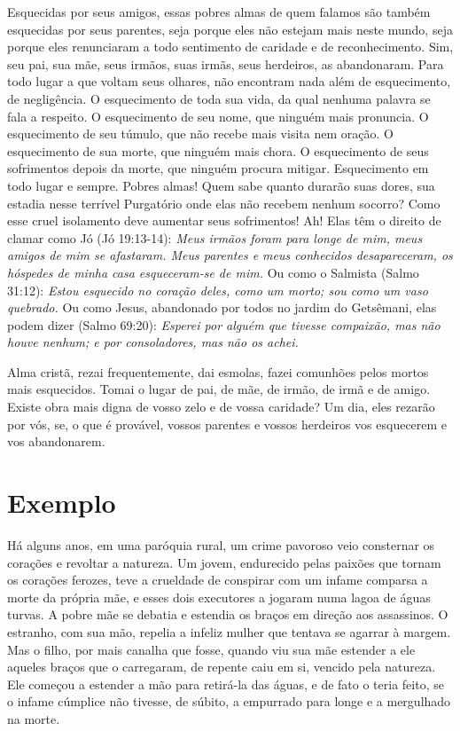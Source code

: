 Esquecidas por seus amigos, essas pobres almas de quem falamos são também esquecidas por seus parentes, seja porque eles não estejam mais neste mundo, seja porque eles renunciaram a todo sentimento de caridade e de reconhecimento. Sim, seu pai, sua mãe, seus irmãos, suas irmãs, seus herdeiros, as abandonaram. Para todo lugar a que voltam seus olhares, não encontram nada além de esquecimento, de negligência. O esquecimento de toda sua vida, da qual nenhuma palavra se fala a respeito. O esquecimento de seu nome, que ninguém mais pronuncia. O esquecimento de seu túmulo, que não recebe mais visita nem oração. O esquecimento de sua morte, que ninguém mais chora. O esquecimento de seus sofrimentos depois da morte, que ninguém procura mitigar. Esquecimento em todo lugar e sempre. Pobres almas! Quem sabe quanto durarão suas dores, sua estadia nesse terrível Purgatório onde elas não recebem nenhum socorro? Como esse cruel isolamento deve aumentar seus sofrimentos! Ah! Elas têm o direito de clamar como Jó (Jó 19:13-14): \textit{Meus irmãos foram para longe de mim, meus amigos de mim se afastaram. Meus parentes e meus conhecidos desapareceram, os hóspedes de minha casa esqueceram-se de mim.} Ou como o Salmista (Salmo 31:12): \textit{Estou esquecido no coração deles, como um morto; sou como um vaso quebrado.} Ou como Jesus, abandonado por todos no jardim do Getsêmani, elas podem dizer (Salmo 69:20): \textit{Esperei por alguém que tivesse compaixão, mas não houve nenhum; e por consoladores, mas não os achei.} 

Alma cristã, rezai frequentemente, dai esmolas, fazei comunhões pelos mortos mais esquecidos. Tomai o lugar de pai, de mãe, de irmão, de irmã e de amigo. Existe obra mais digna de vosso zelo e de vossa caridade? Um dia, eles rezarão por vós, se, o que é provável, vossos parentes e vossos herdeiros vos esquecerem e vos abandonarem.


\section*{Exemplo }

Há alguns anos, em uma paróquia rural, um crime pavoroso veio consternar os corações e revoltar a natureza. Um jovem, endurecido pelas paixões que tornam os corações ferozes, teve a crueldade de conspirar com um infame comparsa a morte da própria mãe, e esses dois executores a jogaram numa lagoa de águas turvas. A pobre mãe se debatia e estendia os braços em direção aos assassinos. O estranho, com sua mão, repelia a infeliz mulher que tentava se agarrar à margem. Mas o filho, por mais canalha que fosse, quando viu sua mãe estender a ele aqueles braços que o carregaram, de repente caiu em si, vencido pela natureza. Ele começou a estender a mão para retirá-la das águas, e de fato o teria feito, se o infame cúmplice não tivesse, de súbito, a empurrado para longe e a mergulhado na morte. 

